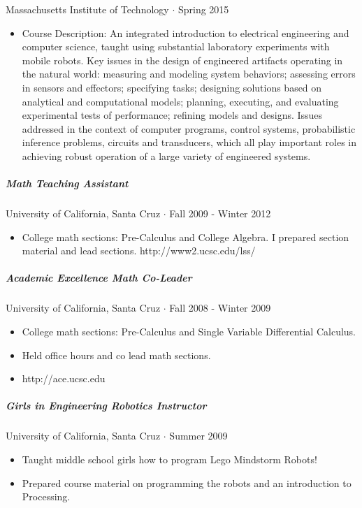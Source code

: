 \documentclass[10pt,letterpaper]{article}
\begin{document}
Massachusetts Institute of Technology $\cdot$ Spring 2015
\begin{itemize}
\item Course Description: An integrated introduction to electrical engineering and computer science, taught using substantial laboratory experiments with mobile robots. Key issues in the design of engineered artifacts operating in the natural world: measuring and modeling system behaviors; assessing errors in sensors and effectors; specifying tasks; designing solutions based on analytical and computational models; planning, executing, and evaluating experimental tests of performance; refining models and designs. Issues addressed in the context of computer programs, control systems, probabilistic inference problems, circuits and transducers, which all play important roles in achieving robust operation of a large variety of engineered systems.
\end{itemize}

\subparagraph{Math Teaching Assistant}
University of California, Santa Cruz  $\cdot$ Fall 2009 - Winter 2012
\begin{itemize}
\item College math sections: Pre-Calculus and College Algebra. I prepared section material and lead sections. http://www2.ucsc.edu/lss/
\end{itemize}

\subparagraph{Academic Excellence Math Co-Leader}
University of California, Santa Cruz  $\cdot$ Fall 2008 - Winter 2009
\begin{itemize}
\item College math sections: Pre-Calculus and Single Variable Differential Calculus.
\item Held office hours and co lead math sections.
\item http://ace.ucsc.edu
\end{itemize}

\subparagraph{Girls in Engineering Robotics Instructor}
University of California, Santa Cruz $\cdot$ Summer 2009
\begin{itemize}
\item Taught middle school girls how to program Lego Mindstorm Robots!
\item Prepared course material on programming the robots and an introduction to Processing.
\end{itemize}
\end{document}
